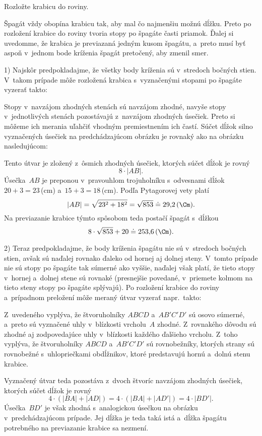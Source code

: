 {%
\napad
Rozložte krabicu do roviny.

\riesenie
Špagát vždy obopína krabicu tak, aby mal čo najmenšiu možnú dĺžku.
Preto po rozložení krabice do roviny tvoria stopy po špagáte časti priamok.
Ďalej si uvedomme, že krabica je previazaná jedným kusom špagátu,
a~preto musí byť aspoň v~jednom bode kríženia špagát pretočený, aby zmenil
smer.

1)
Najskôr predpokladajme, že všetky body kríženia sú v~stredoch bočných
stien.
V~takom prípade môže rozložená krabica s~vyznačenými stopami po špagáte
vyzerať takto:
%

Stopy v~navzájom zhodných stenách sú navzájom zhodné,
navyše stopy v~jednotlivých stenách pozostávajú z~navzájom zhodných
úsečiek.
Preto si môžeme ich merania uľahčiť vhodným premiestnením ich častí.
Súčet dĺžok silno vyznačených úsečiek na predchádzajúcom obrázku je rovnaký ako
na obrázku nasledujúcom:
%

Tento útvar je zložený z~ôsmich zhodných úsečiek, ktorých súčet dĺžok je
rovný
$$
8\cdot|AB|.
$$
Úsečka~$AB$ je preponou v~pravouhlom trojuholníku s~odvesnami dĺžok
$20+3=23$\,(cm) a~$15+3=18$\,(cm).
Podľa Pytagorovej vety platí
$$
|AB|=\sqrt{23^2+18^2}=\sqrt{853}\doteq29{,}2\,(\Cm).
$$
Na previazanie krabice týmto spôsobom teda postačí špagát s~dĺžkou
$$
8\cdot\sqrt{853}+20\doteq253{,}6\,(\Cm).
$$

2)
Teraz predpokladajme, že body kríženia špagátu nie sú v~stredoch bočných
stien, avšak sú naďalej rovnako ďaleko od hornej aj dolnej steny.
V~tomto prípade nie sú stopy po špagáte tak súmerné ako vyššie, naďalej však
platí, že tieto stopy v~hornej a~dolnej stene sú rovnaké
(presnejšie povedané, v~priemete kolmom na tieto steny stopy po špagáte splývajú).
Po rozložení krabice do roviny a~prípadnom preložení môže meraný útvar
vyzerať napr.~takto:
%

Z~uvedeného vyplýva, že štvoruholníky $ABCD$ a~$AB'C'D'$ sú osovo
súmerné, a~preto sú vyznačené uhly v~blízkosti vrcholu~$A$ zhodné.
Z~rovnakého dôvodu sú zhodné aj zodpovedajúce uhly v~blízkosti každého
ďalšieho vrcholu.
Z~toho vyplýva, že štvoruholníky $ABCD$ a~$AB'C'D'$ sú rovnobežníky,
ktorých strany sú rovnobežné s~uhlopriečkami obdĺžnikov, ktoré predstavujú
hornú a~dolnú stenu krabice.

Vyznačený útvar teda pozostáva z~dvoch štvoríc navzájom zhodných úsečiek,
ktorých súčet dĺžok je rovný
$$
4\cdot(|BA|+|AD|)=
4\cdot(|BA|+|AD'|)=
4\cdot|BD'|.
$$
Úsečka~$BD'$ je však zhodná s~analogickou úsečkou na obrázku v~predchádzajúcom
prípade.
Jej dĺžka je teda taká istá a~dĺžka špagátu potrebného na previazanie krabice
sa nezmení.

}
